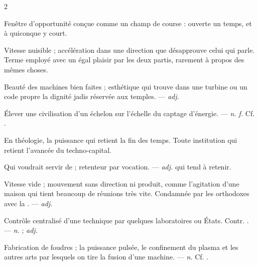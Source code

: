 \begin{multicols}{2}

 Fenêtre d'opportunité conçue comme un champ de course : ouverte un temps, et à quiconque y court.  

 Vitesse nuisible ; accélération dans une direction que désapprouve celui qui parle. Terme employé avec un égal plaisir par les deux partis, rarement à propos des mêmes choses.

 Beauté des machines bien faites ; esthétique qui trouve dans une turbine ou un code propre la dignité jadis réservée aux temples. —  \textit{adj.}

 Élever une civilisation d'un échelon sur l'échelle du captage d'énergie. —  \textit{n. f.} Cf. .

  En théologie, la puissance qui retient la fin des temps.   Toute institution qui retient l'avancée du techno-capital.

 Qui voudrait servir de  ; retenteur par vocation. —  \textit{adj.} qui tend à retenir.

 Vitesse vide ; mouvement sans direction ni produit, comme l'agitation d'une maison qui tient beaucoup de réunions très vite. Condamnée par les orthodoxes avec la . —  \textit{adj.}

 Contrôle centralisé d'une technique par quelques laboratoires ou États. Contr. . —  \textit{n.} ;  \textit{adj.}

 Fabrication de foudres ; la puissance pulsée, le confinement du plasma et les autres arts par lesquels on tire la fusion d'une machine. —  \textit{n.} Cf. .


\end{multicols}
